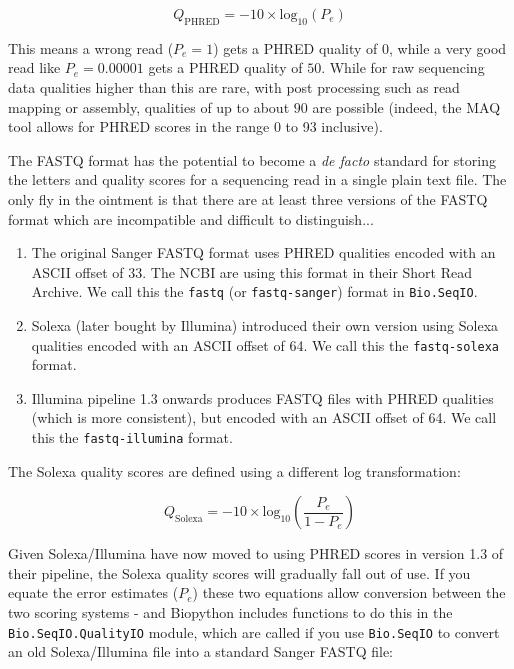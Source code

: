 \begin{equation}
Q_{\textrm{PHRED}} = - 10 \times \textrm{log}_{10} ( P_e )
\end{equation}

This means a wrong read ($P_e = 1$) gets a PHRED quality of $0$, while a very
good read like $P_e = 0.00001$ gets a PHRED quality of $50$. While for raw
sequencing data qualities higher than this are rare, with post processing
such as read mapping or assembly, qualities of up to about $90$ are possible
(indeed, the MAQ tool allows for PHRED scores in the range 0 to 93 inclusive).

The FASTQ format has the potential to become a \textit{de facto} standard for
storing the letters and quality scores for a sequencing read in a single plain
text file. The only fly in the ointment is that there are at least three
versions of the FASTQ format which are incompatible and difficult to
distinguish...

\begin{enumerate}
\item The original Sanger FASTQ format uses PHRED qualities encoded with an
ASCII offset of 33. The NCBI are using this format in their Short Read
Archive. We call this the \texttt{fastq} (or \texttt{fastq-sanger}) format
in \verb|Bio.SeqIO|.
\item Solexa (later bought by Illumina) introduced their own version using
Solexa qualities encoded with an ASCII offset of 64. We call this the
\texttt{fastq-solexa} format.
\item Illumina pipeline 1.3 onwards produces FASTQ files with PHRED qualities
(which is more consistent), but encoded with an ASCII offset of 64. We call
this the \texttt{fastq-illumina} format.
\end{enumerate}

The Solexa quality scores are defined using a different log transformation:

\begin{equation}
Q_{\textrm{Solexa}} = - 10 \times \textrm{log}_{10} \left( \frac{P_e}{1-P_e} \right)
\end{equation}

Given Solexa/Illumina have now moved to using PHRED scores in version 1.3 of
their pipeline, the Solexa quality scores will gradually fall out of use.
If you equate the error estimates ($P_e$) these two equations allow conversion
between the two scoring systems - and Biopython includes functions to do this
in the \verb|Bio.SeqIO.QualityIO| module, which are called if you use
\verb|Bio.SeqIO| to convert an old Solexa/Illumina file into a standard Sanger
FASTQ file:

